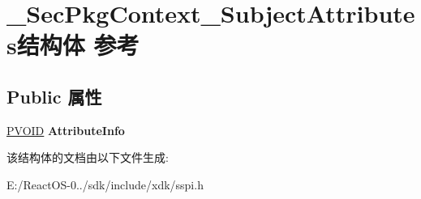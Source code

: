 \hypertarget{struct___sec_pkg_context___subject_attributes}{}\section{\+\_\+\+Sec\+Pkg\+Context\+\_\+\+Subject\+Attributes结构体 参考}
\label{struct___sec_pkg_context___subject_attributes}
\subsection*{Public 属性}
\begin{DoxyCompactItemize}
\item 
\mbox{\label{struct___sec_pkg_context___subject_attributes_a7e549f57893e93a1750982e4ac26ddb6}} 
\hyperlink{interfacevoid}{P\+V\+O\+ID} {\bfseries Attribute\+Info}
\end{DoxyCompactItemize}


该结构体的文档由以下文件生成\+:\begin{DoxyCompactItemize}
\item 
E\+:/\+React\+O\+S-\/0../sdk/include/xdk/sspi.\+h\end{DoxyCompactItemize}
